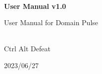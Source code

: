 \begin{titlepage}
    \centering


    
    \vspace{2cm}
    \hrulefill\\
    \vspace{1cm}
    {\Huge\bfseries User Manual v1.0}
    
    \vspace{1cm}
    
    {\Large User Manual for Domain Pulse}\\
    \vspace{1cm}
    \hrulefill\\
    
    \vfill
    
    {\large Ctrl Alt Defeat}
    
    \vspace{1cm}
    
    {\large 2023/06/27}\\
    
\end{titlepage}
  
